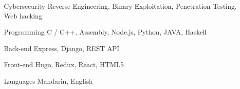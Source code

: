 

\begin{cvskills}

  \cvskill
    {Cybersecurity} %
    {Reverse Engineering, Binary Exploitation, Penetration Testing, Web hacking} %

  \cvskill
    {Programming} %
    {C / C++, Assembly, Node.js, Python, JAVA, Haskell} %

  \cvskill
    {Back-end} %
    {Express, Django, REST API} %

  \cvskill
    {Front-end} %
    {Hugo, Redux, React, HTML5} %

  \cvskill
    {Languages} %
    {Mandarin, English} %

\end{cvskills}
